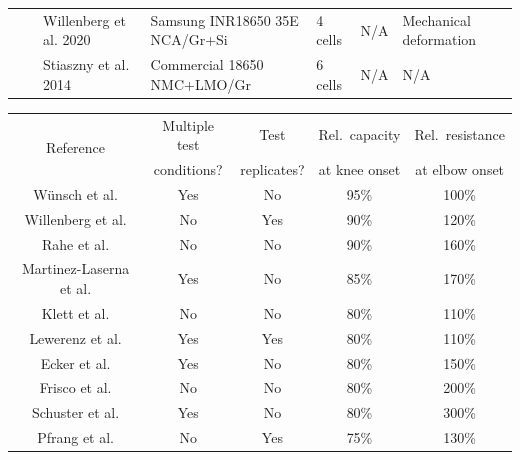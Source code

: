 \documentclass[journal=jpclcd,manuscript=article]{achemso}
\begin{document}
\begin{landscape}
\begin{table}[p]
{\begin{tabular}{|c|c|l|l|l|l|l|}
 \cline{3-7} 
 & \multicolumn{1}{l|}{} & Willenberg et al. 2020 \cite{willenberg_high-precision_2020} & Samsung INR18650 35E NCA/Gr+Si & 4 cells & N/A & Mechanical deformation \\ 
 \cline{3-7} 
 & \multicolumn{1}{l|}{} & Stiaszny et al. 2014 \cite{stiaszny_electrochemical_2014} & Commercial 18650 NMC+LMO/Gr & 6 cells & N/A & N/A \\ 
 \hline
\end{tabular}
}
\label{tab:experimental_summary}
\end{table}

\end{landscape}
 \restoregeometry


\begin{table}[!ht]
    \centering
    \begin{tabular}{|c||c|c|c|c|}
        \hline
\multirow{2}{*}{Reference}
& Multiple test & Test        & Rel.~capacity & Rel.~resistance \\
& conditions?   & replicates? & at knee onset & at elbow onset \\
        \hline
        Wünsch et al.\cite{wunsch_investigation_2019} & Yes & No & 95\% & 100\% \\
        Willenberg et al.\cite{willenberg_development_2020} & No & Yes & 90\% & 120\% \\
        Rahe et al.\cite{rahe_nanoscale_2019} & No & No & 90\% & 160\% \\
        Martinez-Laserna et al.\cite{martinez-laserna_technical_2018} & Yes & No &  85\% & 170\% \\
        Klett et al.\cite{klett_non-uniform_2014} & No & No & 80\% & 110\% \\
        Lewerenz et al.\cite{lewerenz_systematic_2017, lewerenz_post-mortem_2017} & Yes & Yes & 80\% & 110\% \\
        Ecker et al.\cite{ecker_calendar_2014} & Yes & No & 80\% & 150\% \\
        Frisco et al.\cite{frisco_understanding_2016} & No & No & 80\% & 200\% \\
        Schuster et al.\cite{schuster_nonlinear_2015} & Yes & No & 80\% & 300\% \\
        Pfrang et al.\cite{pfrang_long-term_2018} & No & Yes & 75\% & 130\% \\

\end{tabular}
\end{table}
\end{document}
